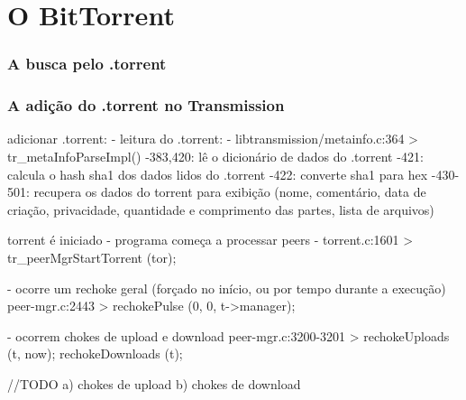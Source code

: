 \chapter{O BitTorrent}

\subsection{A busca pelo .torrent}

\subsection{A adição do .torrent no Transmission}

adicionar .torrent:
- leitura do .torrent:
	- libtransmission/metainfo.c:364 > tr_metaInfoParseImpl()
		-383,420: lê o dicionário de dados do .torrent
		-421: calcula o hash sha1 dos dados lidos do .torrent
		-422: converte sha1 para hex
		-430-501: recupera os dados do torrent para exibição (nome, comentário, data de criação,
		privacidade, quantidade e comprimento das partes, lista de arquivos)


torrent é iniciado
- programa começa a processar peers
	- torrent.c:1601 > tr_peerMgrStartTorrent (tor);

	- ocorre um rechoke geral (forçado no início, ou por tempo durante a execução)
	peer-mgr.c:2443 > rechokePulse (0, 0, t->manager);

	- ocorrem chokes de upload e download
	peer-mgr.c:3200-3201 >  rechokeUploads (t, now);
                            rechokeDownloads (t);

	//TODO
	a) chokes de upload
	b) chokes de download